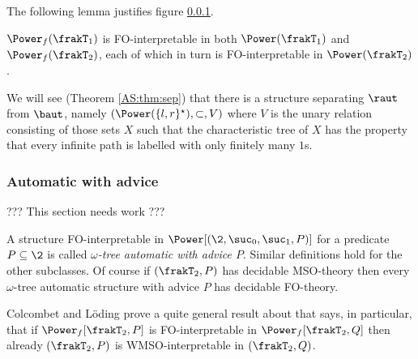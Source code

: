 The following lemma justifies figure \ref{}.

\begin{lemma} \label{AS:lem:relations}
$\Power_f(\frakT_1)$ is FO-interpretable in both $\Power(\frakT_1)$ and $\Power_f(\frakT_2)$, each of which in turn is
FO-interpretable in $\Power(\frakT_2)$.
\end{lemma} %

We will see (Theorem \ref{AS:thm:sep}) that there is a structure separating $\raut$ from $\baut$, namely $(\Power(\{l,r\}^\star),\subset,V)$ where $V$ is the unary relation consisting of those sets $X$ such that
the characteristic tree of $X$ has the property that every infinite path is labelled with only finitely many $1$s.

\subsubsection{Automatic with advice} ??? This section needs work ???

A structure FO-interpretable in $\Power[(\2,\suc_0,\suc_1,P)]$ for a predicate $P \subseteq \2$ is called
{\em $\omega$-tree automatic with advice $P$}. Similar definitions hold for the other subclasses.
Of course if $(\frakT_2,P)$ has decidable MSO-theory then every $\omega$-tree automatic structure with advice $P$
has decidable FO-theory. %

Colcombet and L\"oding prove a quite general result about that says, in particular, that if $\Power_f[\frakT_2,P]$ is FO-interpretable in $\Power_f[\frakT_2,Q]$
then already $(\frakT_2,P)$ is WMSO-interpretable in $(\frakT_2,Q)$. 



%




